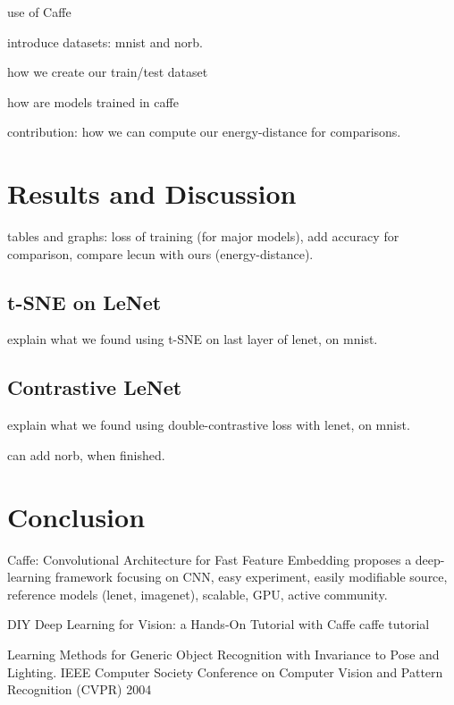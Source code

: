 \documentclass[a4paper,12pt]{report}
\begin{document}
use of Caffe

introduce datasets: mnist and norb.

how we create our train/test dataset

how are models trained in caffe

contribution: how we can compute our energy-distance for comparisons.


\chapter{Results and Discussion}

tables and graphs: loss of training (for major models), add accuracy for comparison, compare lecun with ours (energy-distance).

\section{t-SNE on LeNet}
explain what we found using t-SNE on last layer of lenet, on mnist.

\section{Contrastive LeNet}
explain what we found using double-contrastive loss with lenet, on mnist.

can add norb, when finished.


\chapter{Conclusion}

{}


Caffe: Convolutional Architecture for Fast Feature Embedding
proposes a deep-learning framework focusing on CNN, easy experiment, easily modifiable source, reference models (lenet, imagenet), scalable, GPU, active community.

DIY Deep Learning for Vision: a Hands-On Tutorial with Caffe
caffe tutorial

Learning Methods for Generic Object Recognition with Invariance to Pose and Lighting. IEEE Computer Society Conference on Computer Vision and Pattern Recognition (CVPR) 2004
\end{document}
